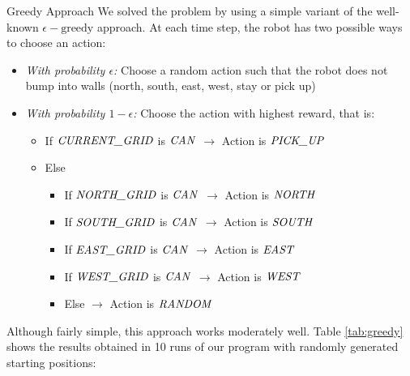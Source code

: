 \documentclass[conference]{IEEEtran}
\makeatletter
\renewcommand\section{\@startsection{section}{1}{\z@}
                                  {-3.0ex plus -1.5ex minus -0.5ex}
                                  {0.7ex plus 1ex minus 0ex}
                                  {\bfseries}}
\makeatother
\begin{document}
\section{Greedy Approach}
We solved the problem
by using a simple variant of the well-known $\epsilon-\text{greedy}$ approach. 
At each time step, the robot has two possible ways to choose an action:
\begin{itemize}
\item{\textit{With probability $\epsilon$:} Choose a random action such that the
robot does not bump into walls (north, south,
east, west, stay or pick up)}
\item{\textit{With probability $1-\epsilon$:} Choose the action with highest reward,
that is:
	\begin{itemize}
	\item{If $\ArgSty{CURRENT\_GRID}$ is $\ArgSty{CAN}$ $\rightarrow$ Action is $\ArgSty{PICK\_UP}$}
	\item{Else \begin{itemize}
		\item{If $\ArgSty{NORTH\_GRID}$ is $\ArgSty{CAN}$ $\rightarrow$ Action is $\ArgSty{NORTH}$ }
		\item{If $\ArgSty{SOUTH\_GRID}$ is $\ArgSty{CAN}$ $\rightarrow$ Action is $\ArgSty{SOUTH}$ }
		\item{If $\ArgSty{EAST\_GRID}$ is $\ArgSty{CAN}$ $\rightarrow$ Action is $\ArgSty{EAST}$ }
		\item{If $\ArgSty{WEST\_GRID}$ is $\ArgSty{CAN}$ $\rightarrow$ Action is $\ArgSty{WEST}$ }		
		\item{Else $\rightarrow$ Action is $\ArgSty{RANDOM}$ }						
		\end{itemize}
	}
	\end{itemize}
}
\end{itemize}

Although fairly simple, this approach works
moderately well. Table \ref{tab:greedy} shows the results obtained in 10 runs of our program
with randomly generated starting positions:
\end{document}
